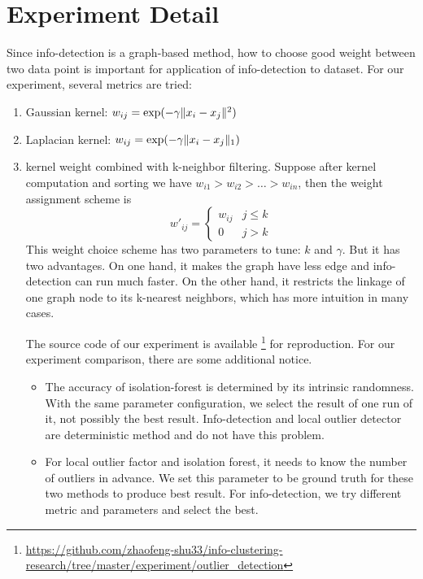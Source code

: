 \documentclass[runningheads]{llncs}
\begin{document}
\section{Experiment Detail}
Since info-detection is a graph-based method, how to choose good weight between two data point is important for application of info-detection to dataset. For our experiment, several metrics are tried: 
\begin{enumerate}
\item Gaussian kernel: $w_{ij} = \exp(-\gamma \lVert x_i - x_j\rVert^2)$
\item Laplacian kernel: $w_{ij} = \exp(-\gamma \lVert x_i - x_j\rVert_1)$
\item kernel weight combined with k-neighbor filtering. Suppose after kernel computation and sorting we have $w_{i1} > w_{i2} > \dots > w_{in}$, then the weight assignment scheme is
$$
w'_{ij}  = 
\begin{cases}
 w_{ij} & j \leq k \\
 0 & j > k
\end{cases}
$$
This weight choice scheme has two parameters to tune: $k$ and $\gamma$. But it has two advantages. On one hand, it makes the graph have less edge and info-detection can run much faster. On the other hand, it restricts the linkage of one graph node to its k-nearest neighbors, which has more intuition in many cases.

The source code of our experiment is available \footnote{\scriptsize\url{https://github.com/zhaofeng-shu33/info-clustering-research/tree/master/experiment/outlier\_detection}} for reproduction.
For our experiment comparison, there are some additional notice.
\begin{itemize}
\item The accuracy of isolation-forest is determined by its intrinsic randomness. With the same parameter configuration, we select the result of one run of it, not possibly the best result. Info-detection and local outlier detector are deterministic method and do not have this problem.
\item For local outlier factor and isolation forest, it needs to know the number of outliers in advance. We set this parameter to be ground truth for these two methods to produce best result. For info-detection, we try different metric and parameters and select the best.
\end{itemize}

\end{enumerate} 
\end{document}

